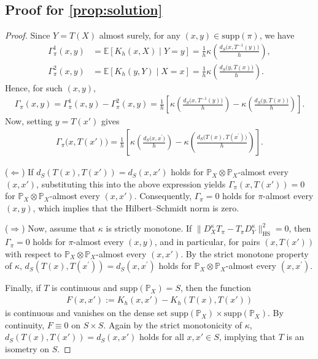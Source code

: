 \documentclass{article}
\begin{document}
\subsection{Proof for \cref{prop:solution}}\label{pf:prop:solution}
\begin{proof}
	Since $Y = T(X)$ almost surely, for any $(x,y) \in \mathrm{supp}(\pi)$, we have
	\begin{align*}
		\Gamma_\pi^1(x,y) &= \mathbb{E}[K_h(x,X)\mid Y=y] = \frac{1}{h}\kappa\left(\frac{d_S\bigl(x,T^{-1}(y)\bigr)}{h}\right), \\
		\Gamma_\pi^2(x,y) &= \mathbb{E}[K_h(y,Y)\mid X=x] = \frac{1}{h}\kappa\left(\frac{d_S\bigl(y,T(x)\bigr)}{h}\right).
	\end{align*}
	Hence, for such $(x,y)$,
	\begin{align*}
		\Gamma_\pi(x,y)
		= \Gamma_\pi^1(x,y) - \Gamma_\pi^2(x,y)
		= \frac{1}{h}\left[\kappa\left(\frac{d_S\bigl(x,T^{-1}(y)\bigr)}{h}\right) - \kappa\left(\frac{d_S\bigl(y,T(x)\bigr)}{h}\right)\right] .
	\end{align*}
	Now, setting $y = T(x')$ gives
	\begin{align*}
		\Gamma_\pi\bigl(x,T(x')\bigr)
		= \frac{1}{h}\left[\kappa\left(\frac{d_S\bigl(x,x^\prime\bigr)}{h}\right) - \kappa\left(\frac{d_S\bigl(T(x),T(x^\prime)\bigr)}{h}\right)\right] .
	\end{align*}
	
	($\Leftarrow$) If $d_S(T(x),T(x')) = d_S(x,x')$ holds for $\mathbb{P}_X \otimes \mathbb{P}_X$-almost every $(x,x')$, substituting this into the above expression yields $\Gamma_\pi(x,T(x')) = 0$ for $\mathbb{P}_X \otimes \mathbb{P}_X$-almost every $(x,x')$. Consequently, $\Gamma_\pi = 0$ holds for $\pi$-almost every $(x,y)$, which implies that the Hilbert–Schmidt norm is zero.
	
	($\Rightarrow$) Now, assume that $\kappa$ is strictly monotone. If $\|D_X^{\kappa}T_\pi - T_\pi D_Y^{\kappa}\|_{\mathrm{HS}}^2 = 0$, then $\Gamma_\pi = 0$ holds for $\pi$-almost every $(x,y)$, and in particular, for pairs $(x,T(x'))$ with respect to $\mathbb{P}_X \otimes \mathbb{P}_X$-almost every $(x,x')$. By the strict monotone property of $\kappa$, $d_S(T(x),T(x^\prime)) = d_S(x,x^\prime)$ holds for $\mathbb{P}_X \otimes \mathbb{P}_X$-almost every $(x,x^\prime)$.
	
	Finally, if $T$ is continuous and $\mathrm{supp}(\mathbb{P}_X) = S$, then the function
	\begin{align*}
		F(x,x') := K_h(x,x') - K_h(T(x),T(x'))
	\end{align*}
	is continuous and vanishes on the dense set $\mathrm{supp}(\mathbb{P}_X) \times \mathrm{supp}(\mathbb{P}_X)$.  
	By continuity, $F \equiv 0$ on $S \times S$.
	Again by the strict monotonicity of $\kappa$, $d_S(T(x),T(x')) = d_S(x,x')$ holds for all $x,x' \in S$, implying that $T$ is an isometry on $S$.
\end{proof}
\end{document}
